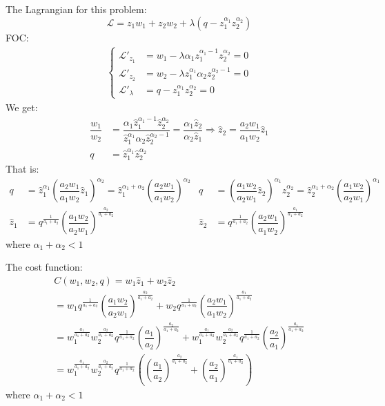 \documentclass[a4paper,12pt]{article} %
\begin{document}
\begin{enumerate}
	The  Lagrangian for this problem: 
	\[  \mathcal{L} =   z_1 w_1 + z_2 w_2 + \lambda  ( q - z_1^{\alpha_1} z_2^{\alpha_2} ) \]
	FOC: 
	\begin{align*}
	 \begin{cases}
	 \mathcal{L}'_{z_1 } & =  w_1  -  \lambda \alpha_1 z_1^{\alpha_1-1} z_2^{\alpha_2}  = 0    \\
	\mathcal{L}'_{z_2 } & =  w_2  -  \lambda z_1^{\alpha_1} \alpha_2 z_2^{\alpha_2-1}  = 0  \\
 \mathcal{L}'_{\lambda} & = q - z_1^{\alpha_1} z_2^{\alpha_2} = 0 
\end{cases}
		\end{align*}
We get: 
	\begin{align*}
	\dfrac{w_1 }{w_2} & =  \dfrac{ \alpha_1 \hat{z}_1^{\alpha_1-1} \hat{z}_2^{\alpha_2} }{\hat{z}_1^{\alpha_1} \alpha_2 \hat{z}_2^{\alpha_2-1}} = \dfrac{ \alpha_1 \hat{z}_2}{ \alpha_2 \hat{z}_1} \Rightarrow \hat{z}_2 = \dfrac{a_2 w_1}{a_1 w_2}  \hat{z}_1  \\
q & = \hat{z}_1^{\alpha_1} \hat{z}_2^{\alpha_2}  
	\end{align*}
	That is: 
	\begin{equation}
	\begin{split}
	q  &= \hat{z}_1^{\alpha_1}  \left( \dfrac{a_2 w_1}{a_1 w_2}  \hat{z}_1 \right) ^{\alpha_2}  =  \hat{z}_1^{\alpha_1 + \alpha_2}  \left( \dfrac{a_2 w_1}{a_1 w_2}  \right) ^{\alpha_2}  \\ 
	\hat{z}_1 &=  q^{\frac{1}{a_1+a_2}} \left( \dfrac{a_1 w_2}{a_2 w_1} \right) ^{\frac{a_2}{a_1+a_2}} 
	\end{split}
	\begin{split}
 		q  &= \left( \dfrac{a_1 w_2}{a_2 w_1}  \hat{z}_2 \right) ^{\alpha_1} \hat{z}_2^{\alpha_2}    =  \hat{z}_2^{\alpha_1 + \alpha_2}  \left( \dfrac{a_1 w_2}{a_2 w_1}  \right) ^{\alpha_1}  \\ 
\hat{z}_2 &=  q^{\frac{1}{a_1+a_2}} \left( \dfrac{a_2 w_1}{a_1 w_2} \right) ^{\frac{a_1}{a_1+a_2}}	
 \end{split}
	\end{equation}
	where $ \alpha_1 + \alpha_2  < 1 $
	
	\newpage
	
	The cost
	function:
\begin{multline*}
  C(w_1, w_2, q) = w_1 \hat{z}_1  +  w_2 \hat{z}_2 \\ =   
 w_1 
 q^{\frac{1}{a_1+a_2}} \left( \dfrac{a_1 w_2}{a_2 w_1} \right) ^{\frac{a_2}{a_1+a_2}}  + w_2 q^{\frac{1}{a_1+a_2}} \left( \dfrac{a_2 w_1}{a_1 w_2} \right) ^{\frac{a_1}{a_1+a_2}} \\
 	=  w_1^{\frac{a_1}{a_1+a_2}} w_2^{\frac{a_2}{a_1+a_2}} 
 q^{\frac{1}{a_1+a_2}} \left( \dfrac{a_1 }{a_2 } \right) ^{\frac{a_2}{a_1+a_2}}  + w_1^{\frac{a_1}{a_1+a_2}} w_2^{\frac{a_2}{a_1+a_2}} q^{\frac{1}{a_1+a_2}} \left( \dfrac{a_2 }{a_1 } \right) ^{\frac{a_1}{a_1+a_2}}	\\
 = 	 w_1^{\frac{a_1}{a_1+a_2}} w_2^{\frac{a_2}{a_1+a_2}} 
 q^{\frac{1}{a_1+a_2}} \left( \left( \dfrac{a_1 }{a_2 } \right) ^{\frac{a_2}{a_1+a_2}}  +  \left( \dfrac{a_2 }{a_1 } \right) ^{\frac{a_1}{a_1+a_2}} \right) 
\end{multline*} 
where $ \alpha_1 + \alpha_2  < 1 $


\end{enumerate}
\end{document}
